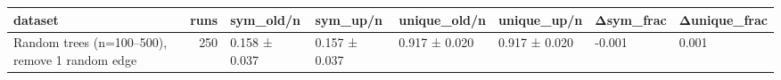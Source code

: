 \begin{tabular}{lrllllll}
\toprule
dataset & runs & sym_old/n & sym_up/n & unique_old/n & unique_up/n & Δsym_frac & Δunique_frac \\
\midrule
Random trees (n=100–500), remove 1 random edge & 250 & 0.158 ± 0.037 & 0.157 ± 0.037 & 0.917 ± 0.020 & 0.917 ± 0.020 & -0.001 & 0.001 \\
\bottomrule
\end{tabular}
